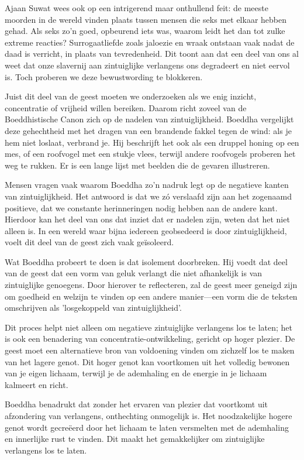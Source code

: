 Ajaan Suwat wees ook op een intrigerend maar onthullend feit: de meeste moorden in de wereld vinden plaats tussen mensen die seks met elkaar hebben gehad. Als seks zo'n goed, opbeurend iets was, waarom leidt het dan tot zulke extreme reacties? Surrogaatliefde zoals jaloezie en wraak ontstaan vaak nadat de daad is verricht, in plaats van tevredenheid. Dit toont aan dat een deel van ons al weet dat onze slavernij aan zintuiglijke verlangens ons degradeert en niet eervol is. Toch proberen we deze bewustwording te blokkeren.

Juist dit deel van de geest moeten we onderzoeken als we enig inzicht, concentratie of vrijheid willen bereiken. Daarom richt zoveel van de Boeddhistische Canon zich op de nadelen van zintuiglijkheid. Boeddha vergelijkt deze gehechtheid met het dragen van een brandende fakkel tegen de wind: als je hem niet loslaat, verbrand je. Hij beschrijft het ook als een druppel honing op een mes, of een roofvogel met een stukje vlees, terwijl andere roofvogels proberen het weg te rukken. Er is een lange lijst met beelden die de gevaren illustreren.

Mensen vragen vaak waarom Boeddha zo'n nadruk legt op de negatieve kanten van zintuiglijkheid. Het antwoord is dat we zó verslaafd zijn aan het zogenaamd positieve, dat we constante herinneringen nodig hebben aan de andere kant. Hierdoor kan het deel van ons dat inziet dat er nadelen zijn, weten dat het niet alleen is. In een wereld waar bijna iedereen geobsedeerd is door zintuiglijkheid, voelt dit deel van de geest zich vaak geïsoleerd.

Wat Boeddha probeert te doen is dat isolement doorbreken. Hij voedt dat deel van de geest dat een vorm van geluk verlangt die niet afhankelijk is van zintuiglijke genoegens. Door hierover te reflecteren, zal de geest meer geneigd zijn om goedheid en welzijn te vinden op een andere manier—een vorm die de teksten omschrijven als 'losgekoppeld van zintuiglijkheid'.

Dit proces helpt niet alleen om negatieve zintuiglijke verlangens los te laten; het is ook een benadering van concentratie-ontwikkeling, gericht op hoger plezier. De geest moet een alternatieve bron van voldoening vinden om zichzelf los te maken van het lagere genot. Dit hoger genot kan voortkomen uit het volledig bewonen van je eigen lichaam, terwijl je de ademhaling en de energie in je lichaam kalmeert en richt.

Boeddha benadrukt dat zonder het ervaren van plezier dat voortkomt uit afzondering van verlangens, onthechting onmogelijk is. Het noodzakelijke hogere genot wordt gecreëerd door het lichaam te laten versmelten met de ademhaling en innerlijke rust te vinden. Dit maakt het gemakkelijker om zintuiglijke verlangens los te laten.

